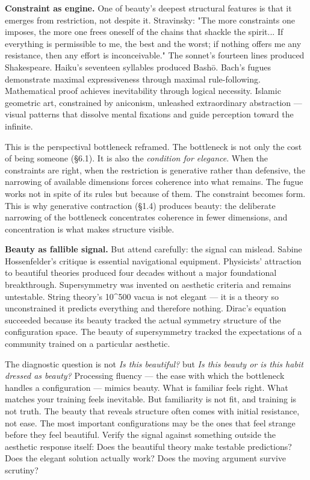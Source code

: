 \textbf{Constraint as engine.} One of beauty's deepest structural features is that it emerges from restriction, not despite it. Stravinsky: "The more constraints one imposes, the more one frees oneself of the chains that shackle the spirit... If everything is permissible to me, the best and the worst; if nothing offers me any resistance, then any effort is inconceivable." The sonnet's fourteen lines produced Shakespeare. Haiku's seventeen syllables produced Bashō. Bach's fugues demonstrate maximal expressiveness through maximal rule-following. Mathematical proof achieves inevitability through logical necessity. Islamic geometric art, constrained by aniconism, unleashed extraordinary abstraction — visual patterns that dissolve mental fixations and guide perception toward the infinite.


This is the perspectival bottleneck reframed. The bottleneck is not only the cost of being someone (§6.1). It is also the \textit{condition for elegance}. When the constraints are right, when the restriction is generative rather than defensive, the narrowing of available dimensions forces coherence into what remains. The fugue works not in spite of its rules but because of them. The constraint becomes form. This is why generative contraction (§1.4) produces beauty: the deliberate narrowing of the bottleneck concentrates coherence in fewer dimensions, and concentration is what makes structure visible.


\textbf{Beauty as fallible signal.} But attend carefully: the signal can mislead. Sabine Hossenfelder's critique is essential navigational equipment. Physicists' attraction to beautiful theories produced four decades without a major foundational breakthrough. Supersymmetry was invented on aesthetic criteria and remains untestable. String theory's 10\textasciicircum{}500 vacua is not elegant — it is a theory so unconstrained it predicts everything and therefore nothing. Dirac's equation succeeded because its beauty tracked the actual symmetry structure of the configuration space. The beauty of supersymmetry tracked the expectations of a community trained on a particular aesthetic.


The diagnostic question is not \textit{Is this beautiful?} but \textit{Is this beauty or is this habit dressed as beauty?} Processing fluency — the ease with which the bottleneck handles a configuration — mimics beauty. What is familiar feels right. What matches your training feels inevitable. But familiarity is not fit, and training is not truth. The beauty that reveals structure often comes with initial resistance, not ease. The most important configurations may be the ones that feel strange before they feel beautiful. Verify the signal against something outside the aesthetic response itself: Does the beautiful theory make testable predictions? Does the elegant solution actually work? Does the moving argument survive scrutiny?


